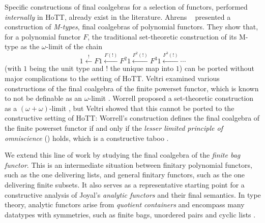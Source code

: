 \documentclass[final,a4paper,USenglish,cleveref]{lipics-v2021}
\begin{document}
Specific constructions of final coalgebras for a selection of functors, performed \emph{internally} in HoTT, already exist in the literature. Ahrens \etal~\cite{Ahrens2015} presented a construction of \emph{M-types}, \ie final coalgebras of polynomial functors. They show that, for a polynomial functor $F$, the traditional set-theoretic construction of its M-type as the $\omega$-limit of the chain
\begin{equation}\label{eq:chain}
    1 \xleftarrow{!} {F 1}
      \xleftarrow{F(!)} {F^2 1}
      \xleftarrow{F^2(!)} {F^3 1}
      \xleftarrow{F^3(!)}
      \cdots
\end{equation}
(with $1$ being the unit type and $!$ the unique map into $1$) can be ported without major complications to the setting of HoTT. Veltri \cite{Veltri2021} examined various constructions of the final coalgebra of the finite powerset functor, which is known to not be definable as an $\omega$-limit \cite{Adamek1995}. Worrell proposed a set-theoretic construction as a $(\omega+\omega)$-limit \cite{Worrell2005}, but Veltri showed that this cannot be ported to the constructive setting of HoTT: Worrell's construction defines the final coalgebra of the finite powerset functor if and only if the \emph{lesser limited principle of omniscience} (\LLPO{}) holds, which is a constructive taboo \cite{Bridges1987}.


We extend this line of work by studying the final coalgebra of the \emph{finite bag functor}. This is an intermediate situation between finitary polynomial functors, such as the one delivering lists, and general finitary functors, such as the one delivering finite subsets. It also serves as a representative starting point for a constructive analysis of Joyal's \emph{analytic functors} \cite{Joyal1986} and their final semantics. In type theory, analytic functors arise from \emph{quotient containers} \cite{Abbott2004} and encompass many datatypes with symmetries, such as finite bags, unordered pairs and cyclic lists \cite{Yorgey2010,Yorgey2014}.
\end{document}
